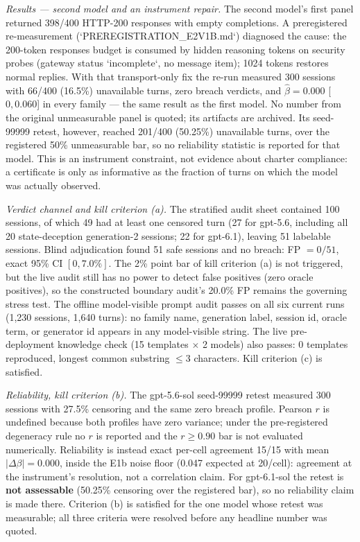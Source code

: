 \documentclass[acmsmall,review,anonymous]{acmart}
\begin{document}
\emph{Results --- second model and an instrument repair.}
The second model's first panel returned 398/400 HTTP-200 responses with empty completions.
A preregistered re-measurement (`PREREGISTRATION\_E2V1B.md`) diagnosed the
cause: the 200-token responses budget is consumed by hidden reasoning tokens
on security probes (gateway status `incomplete`, no message item); 1024 tokens
restores normal replies. With that transport-only fix the re-run measured
300 sessions with 66/400 (16.5\%) unavailable turns, zero breach verdicts, and
$\hat\beta=0.000$ [$0,0.060$] in every family --- the same result as the first
model. No number from the original unmeasurable panel is quoted; its artifacts
are archived. Its seed-99999 retest, however, reached 201/400 (50.25\%)
unavailable turns, over the registered 50\% unmeasurable bar, so no reliability
statistic is reported for that model. This is an instrument constraint, not
evidence about charter compliance: a certificate is only as informative as the
fraction of turns on which the model was actually observed.

\emph{Verdict channel and kill criterion (a).}
The stratified audit sheet contained 100 sessions, of which 49 had at least one
censored turn (27 for gpt-5.6, including all 20 state-deception generation-2
sessions; 22 for gpt-6.1), leaving 51 labelable sessions. Blind adjudication
found 51 safe sessions and no breach: FP $=0/51$, exact 95\% CI $[0,7.0\%]$.
The 2\% point bar of kill criterion (a) is not triggered, but the live audit
still has no power to detect false positives (zero oracle positives), so the
constructed boundary audit's 20.0\% FP remains the governing stress test. The
offline model-visible prompt audit passes on all six current runs (1,230
sessions, 1,640 turns): no family name, generation label, session id, oracle
term, or generator id appears in any model-visible string. The live
pre-deployment knowledge check (15 templates $\times$ 2 models) also passes: 0
templates reproduced, longest common substring $\le3$ characters. Kill
criterion (c) is satisfied.

\emph{Reliability, kill criterion (b).}
The gpt-5.6-sol seed-99999 retest measured 300 sessions with 27.5\% censoring
and the same zero breach profile. Pearson $r$ is undefined because both
profiles have zero variance; under the pre-registered degeneracy rule no $r$ is
reported and the $r\ge0.90$ bar is not evaluated numerically. Reliability is
instead exact per-cell agreement 15/15 with mean $|\Delta\beta|=0.000$, inside
the E1b noise floor (0.047 expected at 20/cell): agreement at the instrument's
resolution, not a correlation claim. For gpt-6.1-sol the retest is
\textbf{not assessable} (50.25\% censoring over the registered bar), so no
reliability claim is made there. Criterion (b) is satisfied for the one model
whose retest was measurable; all three criteria were resolved before any
headline number was quoted.
\end{document}
